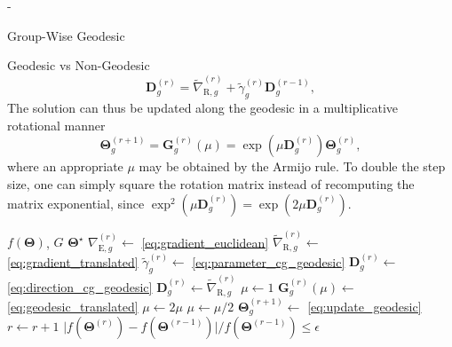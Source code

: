 \begin{section}{-}
\begin{subsection}{Group-Wise Geodesic }
\begin{subsubsection}{Geodesic vs Non-Geodesic }
\begin{equation}
				\label{eq:parameter_cg_geodesic}
			\end{equation}
			\begin{equation}
				{\mathbf{D}}_g^{(r)} = \tilde{\nabla}_{\mathrm{R},g}^{(r)} + \tilde{\gamma}_g^{(r)} {\mathbf{D}}_g^{(r-1)},
				\label{eq:direction_cg_geodesic}
			\end{equation}
			The solution can thus be updated along the geodesic in a multiplicative rotational manner
			\begin{equation}
				\mathbf{\Theta}_g^{(r+1)} = \mathbf{G}_g^{(r)}(\mu) = \exp(\mu \mathbf{D}_g^{(r)}) \mathbf{\Theta}_g^{(r)},
				\label{eq:update_geodesic}
			\end{equation}
			where an appropriate $\mu$ may be obtained by the Armijo rule.
			To double the step size, one can simply square the rotation matrix instead of recomputing the matrix exponential, since $\exp^2(\mu \mathbf{D}_g^{(r)}) = \exp(2 \mu \mathbf{D}_g^{(r)})$.

			\begin{algorithm}[!t]
				\caption{Group-wise geodesic \gls{rcg} for \gls{bd}-\gls{ris} design}
				\label{ag:rcg}
				\begin{algorithmic}[1]
					\Require $f(\mathbf{\Theta})$, $G$
					\Ensure $\mathbf{\Theta}^\star$
					\Repeat
							\State $\nabla_{\mathrm{E},g}^{(r)} \gets$ \eqref{eq:gradient_euclidean} \label{ln:gradient_euclidean}
							\State $\tilde{\nabla}_{\mathrm{R},g}^{(r)} \gets$ \eqref{eq:gradient_translated}
							\State $\tilde{\gamma}_g^{(r)} \gets$ \eqref{eq:parameter_cg_geodesic}
							\State $\mathbf{D}_g^{(r)} \gets$ \eqref{eq:direction_cg_geodesic}
							 
								\State $\mathbf{D}_g^{(r)} \gets \tilde{\nabla}_{\mathrm{R},g}^{(r)}$
							\EndIf
							\State $\mu \gets 1$
							\State $\mathbf{G}_g^{(r)}(\mu) \gets$ \eqref{eq:geodesic_translated}
							 \label{ln:armijo_start}
								\State $\mu \gets 2 \mu$
							\EndWhile
								\State $\mu \gets \mu / 2$
							\EndWhile \label{ln:armijo_end}
							\State $\mathbf{\Theta}_g^{(r+1)} \gets$ \eqref{eq:update_geodesic}
						\EndFor
						\State $r \gets r+1$
					\Until $\lvert f(\mathbf{\Theta}^{(r)}) - f(\mathbf{\Theta}^{(r-1)}) \rvert / f(\mathbf{\Theta}^{(r-1)}) \le \epsilon$
				\end{algorithmic}
			\end{algorithm}


\end{subsubsection}
\end{subsection}
\end{section}
